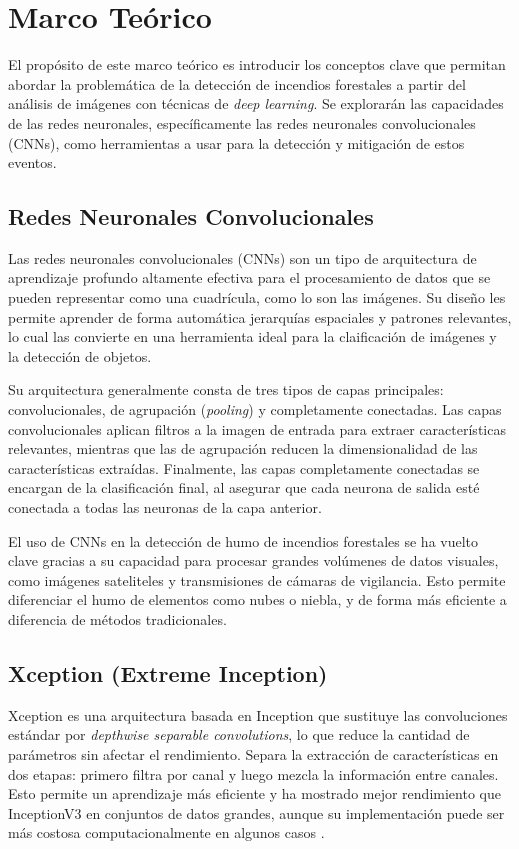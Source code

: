 \section{Marco Teórico}
El propósito de este marco teórico es introducir los conceptos clave que permitan abordar
la problemática de la detección de incendios forestales a partir del análisis de imágenes
con técnicas de \textit{deep learning}. Se explorarán las capacidades de las redes neuronales,
específicamente las redes neuronales convolucionales (CNNs), como herramientas a usar
para la detección y mitigación de estos eventos.

\subsection{Redes Neuronales Convolucionales}
Las redes neuronales convolucionales (CNNs) son un tipo de arquitectura de aprendizaje
profundo altamente efectiva para el procesamiento de datos que se pueden representar
como una cuadrícula, como lo son las imágenes. Su diseño les permite aprender de forma
automática jerarquías espaciales y patrones relevantes, lo cual las convierte en una
herramienta ideal para la claificación de imágenes y la detección de objetos.

Su arquitectura generalmente consta de tres tipos de capas principales: convolucionales,
de agrupación (\textit{pooling}) y completamente conectadas. Las capas convolucionales
aplican filtros a la imagen de entrada para extraer características relevantes, mientras
que las de agrupación reducen la dimensionalidad de las características extraídas.
Finalmente, las capas completamente conectadas se encargan de la clasificación final,
al asegurar que cada neurona de salida esté conectada a todas las neuronas de la capa
anterior.

El uso de CNNs en la detección de humo de incendios forestales se ha vuelto clave gracias
a su capacidad para procesar grandes volúmenes de datos visuales, como imágenes sateliteles
y transmisiones de cámaras de vigilancia. Esto permite diferenciar el humo de elementos
como nubes o niebla, y de forma más eficiente a diferencia de métodos tradicionales.

\subsection{Xception (Extreme Inception)}
Xception es una arquitectura basada en Inception que sustituye las convoluciones
estándar por \textit{depthwise separable convolutions}, lo que reduce la cantidad de
parámetros sin afectar el rendimiento. Separa la extracción de características en dos
etapas: primero filtra por canal y luego mezcla la información entre canales. Esto
permite un aprendizaje más eficiente y ha mostrado mejor rendimiento que InceptionV3
en conjuntos de datos grandes, aunque su implementación puede ser más costosa
computacionalmente en algunos casos \cite{sathishkumar_forest_2023}.


